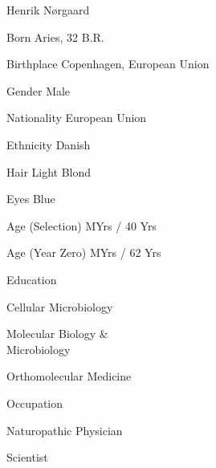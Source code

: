 

{
    \SetupCharacterTable

    \bTABLEbody

        \bTR 
            \bTD[nc=2] \midaligned{\rotate[rotation=42]{\color[red]{\bft Todo: Character's image goes here.}}} \eTD 
        \eTR

        \bTR 
            \bTD[nc=2] Henrik Nørgaard \eTD 
        \eTR

        \bTR
            \bTC Born \eTC
             Aries, 32 B.R. \eTC
        \eTR

        \bTR
            \bTC Birthplace \eTC
            \bTC Copenhagen, European Union \eTC
        \eTR
        
        \bTR
            \bTC Gender \eTC
            \bTC Male \eTC
        \eTR
            
        \bTR
            \bTC Nationality \eTC
            \bTC European Union \eTC
        \eTR
        
        \bTR
            \bTC Ethnicity \eTC
            \bTC Danish \eTC
        \eTR
        
        \bTR
          \bTC Hair \eTC
          \bTC Light Blond \eTC
        \eTR
        
        \bTR
            \bTC Eyes \eTC
            \bTC Blue \eTC
        \eTR

        \bTR
            \bTC Age (Selection) \eTC
             MYrs / 40 Yrs \eTC
        \eTR

        \bTR
            \bTC Age (Year Zero) \eTC
             MYrs / 62 Yrs \eTC
        \eTR

        \bTR
            \bTC Education \eTC
            \bTC 
                \startitemize[4]
                \startpacked
                \item Cellular Microbiology
                \item Molecular Biology &\\Microbiology
                \item Orthomolecular Medicine
                \stoppacked
                \stopitemize
            \eTC
        \eTR
        
        \bTR
            \bTC Occupation \eTC
            \bTC 
                \startitemize[4]
                \startpacked
                \item Naturopathic Physician
                \item Scientist
                \stoppacked
                \stopitemize
            \eTC
        \eTR
        
}
